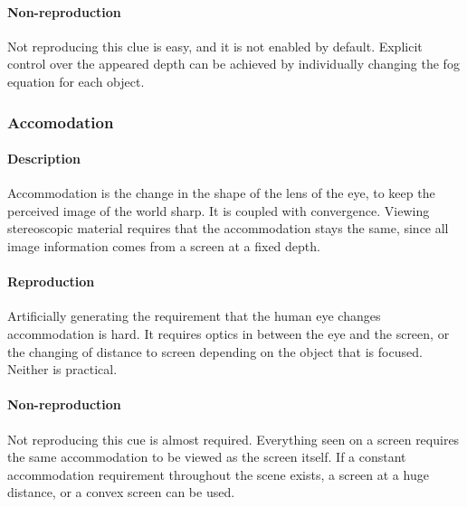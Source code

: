 \paragraph{Non-reproduction}
Not reproducing this clue is easy, and it is not enabled by default. Explicit control over the appeared depth can be achieved by individually changing the fog equation for each object.


\subsubsection{Accomodation}
\paragraph{Description}
Accommodation is the change in the shape of the lens of the eye, to keep the perceived image of the world sharp\cite{accommodation}. It is coupled with convergence. Viewing stereoscopic material requires that the accommodation stays the same, since all image information comes from a screen at a fixed depth.

\paragraph{Reproduction}
Artificially generating the requirement that the human eye changes accommodation is hard. It requires optics in between the eye and the screen, or the changing of distance to screen depending on the object that is focused. Neither is practical.

\paragraph{Non-reproduction}
Not reproducing this cue is almost required. Everything seen on a screen requires the same accommodation to be viewed as the screen itself. If a constant accommodation requirement throughout the scene exists, a screen at a huge distance, or a convex screen can be used.
